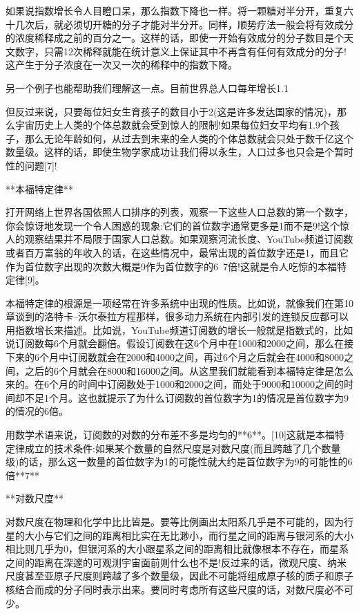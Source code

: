 如果说指数增长令人目瞪口呆，那么指数下降也一样。将一颗糖对半分开，重复六十几次后，就必须切开糖的分子才能对半分开。同样，顺势疗法一般会将有效成分的浓度稀释成之前的百分之一。这样的话，即使一开始有效成分的分子数目是个天文数字，只需12次稀释就能在统计意义上保证其中不再含有任何有效成分的分子!这产生于分子浓度在一次又一次的稀释中的指数下降。

另一个例子也能帮助我们理解这一点。目前世界总人口每年增长1.1%

但反过来说，只要每位妇女生育孩子的数目小于2(这是许多发达国家的情况)，那么宇宙历史上人类的个体总数就会受到惊人的限制!如果每位妇女平均有1.9个孩子，那么无论年龄如何，从过去到未来的全人类的个体总数就会只处于数千亿这个数量级。这样的话，即使生物学家成功让我们得以永生，人口过多也只会是个暂时性的问题[7]!


**本福特定律**

打开网络上世界各国依照人口排序的列表，观察一下这些人口总数的第一个数字，你会惊讶地发现一个令人困惑的现象:它们的首位数字通常更多是1而不是9!这个惊人的观察结果并不局限于国家人口总数。如果观察河流长度、YouTube频道订阅数或者百万富翁的年收入的话，在这些情况中，最常出现的首位数字还是1，而且它作为首位数字出现的次数大概是9作为首位数字的6~7倍!这就是令人吃惊的本福特定律[9]。

本福特定律的根源是一项经常在许多系统中出现的性质。比如说，就像我们在第10章谈到的洛特卡–沃尔泰拉方程那样，很多动力系统在内部引发的连锁反应都可以用指数增长来描述。比如说，YouTube频道订阅数的增长一般就是指数式的，比如说订阅数每6个月就会翻倍。假设订阅数在这6个月中在1000和2000之间，那么在接下来的6个月中订阅数就会在2000和4000之间，再过6个月之后就会在4000和8000之间，之后的6个月就会在8000和16000之间。从这里我们就能看到本福特定律是怎么来的。在6个月的时间中订阅数处于1000和2000之间，而处于9000和10000之间的时间却不足1个月。这也就提示了为什么订阅数的首位数字为1的情况是首位数字为9的情况的6倍。

用数学术语来说，订阅数的对数的分布差不多是均匀的**6**。[10]这就是本福特定律成立的技术条件:如果某个数量的自然尺度是对数尺度(而且跨越了几个数量级)的话，那么这一数量的首位数字为1的可能性就大约是首位数字为9的可能性的6倍**7**


**对数尺度**

对数尺度在物理和化学中比比皆是。要等比例画出太阳系几乎是不可能的，因为行星的大小与它们之间的距离相比实在无比渺小，而行星之间的距离与银河系的大小相比则几乎为0，但银河系的大小跟星系之间的距离相比就像根本不存在，而星系之间的距离在深邃的可观测宇宙面前则什么也不是!反过来的话，微观尺度、纳米尺度甚至亚原子尺度则跨越了多个数量级，因此不可能将组成原子核的质子和原子核结合而成的分子同时表示出来。要同时考虑所有这些尺度的话，对数尺度必不可少。

